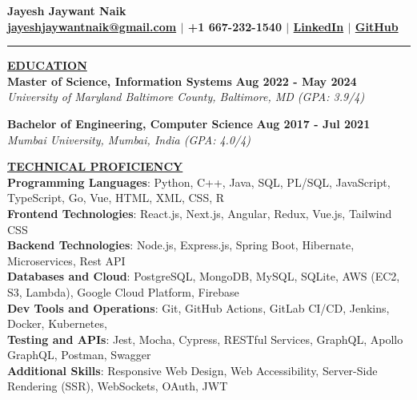 \documentclass{article}
\begin{document}
\begin{center}
\thispagestyle{empty}
\large \textbf{Jayesh Jaywant Naik \\}
\normalsize \textbf{\href{mailto:jayeshjaywantnaik@gmail.com}{jayeshjaywantnaik@gmail.com} $\mid$ +1 667-232-1540 $\mid$ \href{https://www.linkedin.com/in/jayeshjnaik}{LinkedIn} $\mid$ \href{https://github.com/jayeshjnaik}{GitHub} \\}
\rule{\textwidth}{1pt}
\end{center}

\noindent \textbf{\underline{EDUCATION}} \\
\textbf{Master of Science, Information Systems } \hfill \textbf{Aug 2022 - May 2024} \\
\textit{University of Maryland Baltimore County, Baltimore, MD (GPA: 3.9/4)}  
\begin{itemize}[noitemsep,nolistsep,leftmargin=*]
\end{itemize}
\begin{itemize}
\end{itemize}
\textbf{Bachelor of Engineering, Computer Science} \hfill \textbf{Aug 2017 - Jul 2021} \\
\textit{Mumbai University, Mumbai, India (GPA: 4.0/4)}\\
\begin{itemize}[noitemsep,nolistsep,leftmargin=*]
\end{itemize}


\noindent \textbf{\underline{TECHNICAL PROFICIENCY}} \\
\textbf{Programming Languages}{: \small Python, C++, Java, SQL, PL/SQL, JavaScript, TypeScript, Go, Vue, HTML, XML, CSS, R} \\
\textbf{Frontend Technologies}{: \small React.js, Next.js, Angular, Redux, Vue.js, Tailwind CSS} \\
\textbf{Backend Technologies}{: \small Node.js, Express.js, Spring Boot, Hibernate, Microservices, Rest API} \\
\textbf{Databases and Cloud}{: \small PostgreSQL, MongoDB, MySQL, SQLite, AWS (EC2, S3, Lambda), Google Cloud Platform, Firebase} \\
\textbf{Dev Tools and Operations}{: \small Git, GitHub Actions, GitLab CI/CD, Jenkins, Docker, Kubernetes,} \\
\textbf{Testing and APIs}{: \small Jest, Mocha, Cypress, RESTful Services, GraphQL, Apollo GraphQL, Postman, Swagger} \\
\textbf{Additional Skills}{: \small Responsive Web Design, Web Accessibility, Server-Side Rendering (SSR), WebSockets, OAuth, JWT}
\vspace{2mm}
\end{document}
